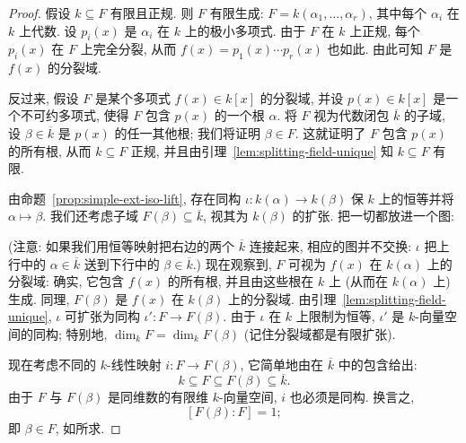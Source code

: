 \begin{proof}
假设 $k\subseteq F$ 有限且正规. 则 $F$ 有限生成: $F=k(\alpha_1,\ldots,\alpha_r)$, 其中每个 $\alpha_i$ 在 $k$ 上代数. 设 $p_i(x)$ 是 $\alpha_i$ 在 $k$ 上的极小多项式. 由于 $F$ 在 $k$ 上正规, 每个 $p_i(x)$ 在 $F$ 上完全分裂, 从而 $f(x)=p_1(x)\cdots p_r(x)$ 也如此. 由此可知 $F$ 是 $f(x)$ 的分裂域.

反过来, 假设 $F$ 是某个多项式 $f(x)\in k[x]$ 的分裂域, 并设 $p(x)\in k[x]$ 是一个不可约多项式, 使得 $F$ 包含 $p(x)$ 的一个根 $\alpha$. 将 $F$ 视为代数闭包 $\overline{k}$ 的子域, 设 $\beta\in\overline{k}$ 是 $p(x)$ 的任一其他根; 我们将证明 $\beta\in F$. 这就证明了 $F$ 包含 $p(x)$ 的所有根, 从而 $k\subseteq F$ 正规, 并且由引理~\ref{lem:splitting-field-unique} 知 $k\subseteq F$ 有限.

由命题~\ref{prop:simple-ext-iso-lift}, 存在同构 $\iota:k(\alpha)\to k(\beta)$ 保 $k$ 上的恒等并将 $\alpha\mapsto\beta$. 我们还考虑子域 $F(\beta)\subseteq\overline{k}$, 视其为 $k(\beta)$ 的扩张. 把一切都放进一个图:

\begin{center}
\end{center}

(注意: 如果我们用恒等映射把右边的两个 $\overline{k}$ 连接起来, 相应的图并不交换: $\iota$ 把上行中的 $\alpha\in\overline{k}$ 送到下行中的 $\beta\in\overline{k}$.) 现在观察到, $F$ 可视为 $f(x)$ 在 $k(\alpha)$ 上的分裂域: 确实, 它包含 $f(x)$ 的所有根, 并且由这些根在 $k$ 上 (从而在 $k(\alpha)$ 上) 生成. 同理, $F(\beta)$ 是 $f(x)$ 在 $k(\beta)$ 上的分裂域. 由引理~\ref{lem:splitting-field-unique}, $\iota$ 可扩张为同构 $\iota':F\to F(\beta)$. 由于 $\iota$ 在 $k$ 上限制为恒等, $\iota'$ 是 $k$-向量空间的同构; 特别地, $\dim_k F=\dim_k F(\beta)$ (记住分裂域都是有限扩张).

现在考虑不同的 $k$-线性映射 $i:F\to F(\beta)$, 它简单地由在 $\overline{k}$ 中的包含给出:
\[
k\subseteq F\subseteq F(\beta)\subseteq\overline{k}.
\]
由于 $F$ 与 $F(\beta)$ 是同维数的有限维 $k$-向量空间, $i$ 也必须是同构. 换言之,
\[
[F(\beta):F]=1;
\]
即 $\beta\in F$, 如所求.
\end{proof}

